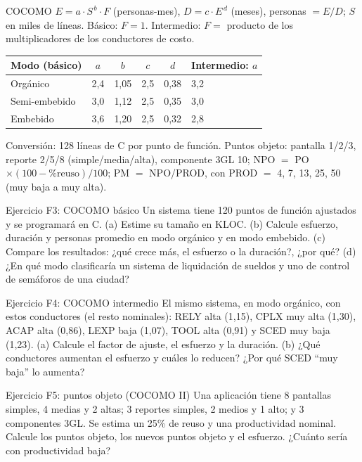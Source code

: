 \documentclass[11pt,a4paper]{article}
\begin{document}
\begin{plantilla}{COCOMO}
$E = a \cdot S^{\,b} \cdot F$ (personas-mes), $D = c \cdot E^{\,d}$ (meses), personas $= E/D$; $S$ en miles de
líneas. Básico: $F = 1$. Intermedio: $F =$ producto de los multiplicadores de los conductores de costo.
\begin{center}
\begin{tabular}{lcccc@{\qquad}l}
\toprule
Modo (básico) & $a$ & $b$ & $c$ & $d$ & Intermedio: $a$\\
\midrule
Orgánico & 2,4 & 1,05 & 2,5 & 0,38 & 3,2\\
Semi-embebido & 3,0 & 1,12 & 2,5 & 0,35 & 3,0\\
Embebido & 3,6 & 1,20 & 2,5 & 0,32 & 2,8\\
\bottomrule
\end{tabular}
\end{center}
Conversión: 128 líneas de C por punto de función. Puntos objeto: pantalla 1/2/3, reporte 2/5/8 (simple/media/alta),
componente 3GL 10; NPO $=$ PO $\times (100 - \%\text{reuso})/100$; PM $=$ NPO/PROD, con PROD $=$ 4, 7, 13, 25, 50
(muy baja a muy alta).
\end{plantilla}
\begin{enunciado}{Ejercicio F3: COCOMO básico}
Un sistema tiene 120 puntos de función ajustados y se programará en C. (a) Estime su tamaño en KLOC. (b) Calcule
esfuerzo, duración y personas promedio en modo orgánico y en modo embebido. (c) Compare los resultados: ¿qué
crece más, el esfuerzo o la duración?, ¿por qué? (d) ¿En qué modo clasificaría un sistema de liquidación de
sueldos y uno de control de semáforos de una ciudad?
\end{enunciado}
\begin{enunciado}{Ejercicio F4: COCOMO intermedio}
El mismo sistema, en modo orgánico, con estos conductores (el resto nominales): RELY alta (1,15), CPLX muy alta
(1,30), ACAP alta (0,86), LEXP baja (1,07), TOOL alta (0,91) y SCED muy baja (1,23). (a) Calcule el factor de
ajuste, el esfuerzo y la duración. (b) ¿Qué conductores aumentan el esfuerzo y cuáles lo reducen? ¿Por qué SCED
``muy baja'' lo aumenta?
\end{enunciado}
\begin{enunciado}{Ejercicio F5: puntos objeto (COCOMO II)}
Una aplicación tiene 8 pantallas simples, 4 medias y 2 altas; 3 reportes simples, 2 medios y 1 alto; y 3
componentes 3GL. Se estima un 25\% de reuso y una productividad nominal. Calcule los puntos objeto, los nuevos
puntos objeto y el esfuerzo. ¿Cuánto sería con productividad baja?
\end{enunciado}
\end{document}

